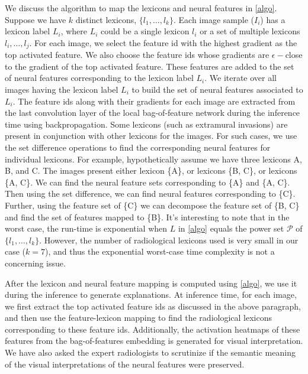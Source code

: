 \documentclass[twocolumn,final]{elsarticle}
\begin{document}
We discuss the algorithm to map the lexicons and neural features in \cref{algo}. Suppose we have $k$ distinct lexicons, $\{l_1, \ldots, l_k\}$. Each image sample ($I_i$) has a lexicon label $L_i$, where $L_i$ could be a single lexicon $l_i$ or a set of multiple lexicons $l_i, \ldots, l_j$. For each image, we select the feature id with the highest gradient as the top activated feature. We also choose the feature ids whose gradients are $\epsilon-$close to the gradient of the top activated feature. These features are added to the set of neural features corresponding to the lexicon label $L_i$. We iterate over all images having the lexicon label $L_i$ to build the set of neural features associated to $L_i$. The feature ids along with their gradients for each image are extracted from the last convolution layer of the local bag-of-feature network during the inference time using backpropagation. Some lexicons (such as extramural invasions) are present in conjunction with other lexicons for the images. For such cases, we use the set difference operations to find the corresponding neural features for individual lexicons. For example, hypothetically assume we have three lexicons A, B, and C. The images present either lexicon \{A\}, or lexicons \{B, C\}, or lexicons \{A, C\}. We can find the neural feature sets corresponding to \{A\} and \{A, C\}. Then using the set difference, we can find neural features corresponding to \{C\}. Further, using the feature set of \{C\} we can decompose the feature set of \{B, C\} and find the set of features mapped to \{B\}. It's interesting to note that in the worst case, the run-time is exponential when $L$ in \cref{algo} equals the power set $\mathcal{P}$ of $\{l_1, \ldots, l_k\}$. However, the number of radiological lexicons used is very small in our case ($k=7$), and thus the exponential worst-case time complexity is not a concerning issue.

\par After the lexicon and neural feature mapping is computed using \cref{algo}, we use it during the inference to generate explanations. At inference time, for each image, we first extract the top activated feature ids as discussed in the above paragraph, and then use the feature-lexicon mapping to find the radiological lexicons corresponding to these feature ids. Additionally, the activation heatmaps of these features from the bag-of-features embedding is generated for visual interpretation. We have also asked the expert radiologists to scrutinize if the semantic meaning of the visual interpretations of the neural features were preserved. 
\end{document}
